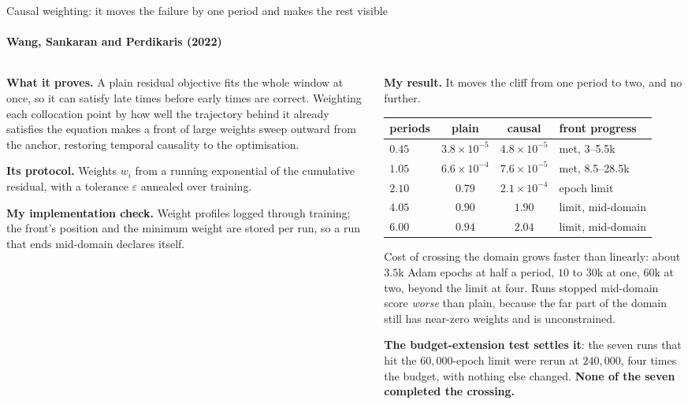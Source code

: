 \documentclass[aspectratio=169,10pt]{beamer}
\newcommand{\hl}[1]{{\color{accent}\textbf{#1}}}
\newcommand{\bad}[1]{{\color{warm}\textbf{#1}}}
\begin{document}
\begin{frame}[shrink=25]{Causal weighting: it moves the failure by one period and makes the rest visible}
  \framesubtitle{Wang, Sankaran and Perdikaris (2022)}
  \vspace{1mm}
  \begin{columns}[T]
    \begin{column}{0.5\textwidth}
      \textbf{What it proves.} A plain residual objective fits the whole window
      at once, so it can satisfy late times before early times are correct.
      Weighting each collocation point by how well the trajectory behind it
      already satisfies the equation makes a front of large weights sweep
      outward from the anchor, restoring temporal causality to the optimisation.
      \medskip

      \textbf{Its protocol.} Weights $w_i$ from a running exponential of the
      cumulative residual, with a tolerance $\varepsilon$ annealed over
      training.
      \medskip

      \textbf{My implementation check.} Weight profiles logged through training;
      the front's position and the minimum weight are stored per run, so a run
      that ends mid-domain declares itself.
    \end{column}
    \begin{column}{0.48\textwidth}
      \textbf{My result.} It moves the cliff from one period to two, and no
      further.
      \smallskip

      \centering\footnotesize
      \begin{tabular}{@{}lccl@{}}
        \toprule
        periods & plain & causal & front progress \\
        \midrule
        $0.45$ & $3.8\times10^{-5}$ & $4.8\times10^{-5}$ & met, 3--5.5k \\
        $1.05$ & $6.6\times10^{-4}$ & $7.6\times10^{-5}$ & met, 8.5--28.5k \\
        $2.10$ & $0.79$ & \hl{$2.1\times10^{-4}$} & epoch limit \\
        $4.05$ & $0.90$ & \bad{$1.90$} & limit, mid-domain \\
        $6.00$ & $0.94$ & \bad{$2.04$} & limit, mid-domain \\
        \bottomrule
      \end{tabular}
      \smallskip

      {\small Cost of crossing the domain grows faster than linearly: about
       $3.5$k Adam epochs at half a period, $10$ to $30$k at one, $60$k at two,
       beyond the limit at four. Runs stopped mid-domain score \emph{worse} than
       plain, because the far part of the domain still has near-zero weights and
       is unconstrained.
       \smallskip

       \hl{The budget-extension test settles it}: the seven runs that hit the
       $60{,}000$-epoch limit were rerun at $240{,}000$, four times the budget,
       with nothing else changed. \bad{None of the seven completed the
       crossing.}}
    \end{column}
  \end{columns}
\end{frame}
\end{document}
